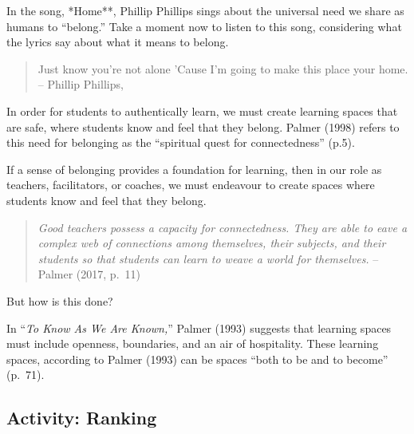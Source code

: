 \documentclass[
]{book}
\begin{document}
In the song, *Home**, Phillip Phillips sings about the universal need we share as humans to ``belong.'' Take a moment now to listen to this song, considering what the lyrics say about what it means to belong.

\begin{quote}
Just know you're not alone
'Cause I'm going to make this place your home.
-- Phillip Phillips,
\end{quote}

\begin{video}

\end{video}

In order for students to authentically learn, we must create learning spaces that are safe, where students know and feel that they belong. Palmer (1998) refers to this need for belonging as the ``spiritual quest for connectedness'' (p.5).

If a sense of belonging provides a foundation for learning, then in our role as teachers, facilitators, or coaches, we must endeavour to create spaces where students know and feel that they belong.

\begin{quote}
\emph{Good teachers possess a capacity for connectedness. They are able to eave a complex web of connections among themselves, their subjects, and their students so that students can learn to weave a world for themselves.} -- Palmer (2017, p.~11)
\end{quote}

But how is this done?

In ``\emph{To Know As We Are Known,}'' Palmer (1993) suggests that learning spaces must include openness, boundaries, and an air of hospitality. These learning spaces, according to Palmer (1993) can be spaces ``both to be and to become'' (p.~71).

\hypertarget{activity-ranking}{%
\subsection{Activity: Ranking}\label{activity-ranking}}
\end{document}

